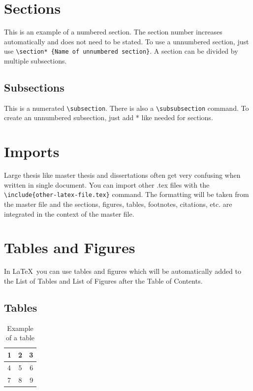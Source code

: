 \documentclass[masterarbeit,grey]{mas-thesis-sections}				%
\begin{document}
\newpage


\section{Sections}

This is an example of a numbered section. The section number increases automatically and does not need to be stated. To use a unnumbered section, just use \texttt{\textbackslash section* \{Name of unnumbered section\}}. A section can be divided by multiple subsections.

\subsection{Subsections}

This is a numerated \texttt{\textbackslash subsection}. There is also a \texttt{\textbackslash subsubsection} command. To create an unnumbered subsection, just add * like needed for sections.

\newpage

\section{Imports}

Large thesis like master thesis and dissertations often get very confusing when written in single document. You can import other .tex files with the\\\texttt{\textbackslash include\{other-latex-file.tex\}} command. The formatting will be taken from the master file and the sections, figures, tables, footnotes, citations, etc. are integrated in the context of the master file.

\newpage


\section{Tables and Figures}

In \LaTeX\ you can use tables and figures which will be automatically added to the List of Tables and List of Figures after the Table of Contents.

\subsection{Tables}

\begin{table}[ht]
\begin{center}
	\begin{tabular}{ l | c | r }
		1 & 2 & 3 \\
		\hline
		4 & 5 & 6 \\
		7 & 8 & 9 \\
	\end{tabular}
	\caption{Example of a table}
	\label{table:1}
\end{center}
\end{table}
\end{document}
